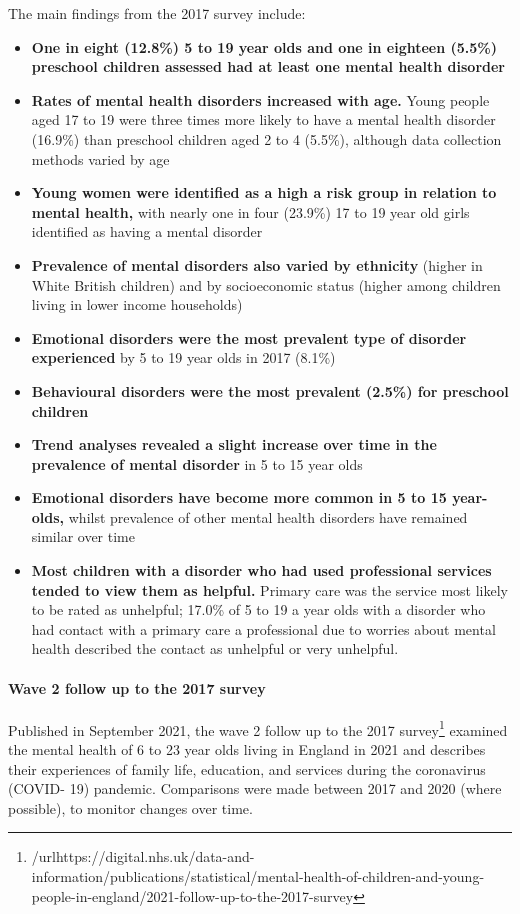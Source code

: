The main findings from the 2017 survey include:
\begin{itemize}[noitemsep]
    \item {\bfseries One in eight (12.8\%) 5 to 19 year olds and one in eighteen (5.5\%) preschool children assessed had at least one mental health disorder}
    \item {\bfseries Rates of mental health disorders increased with age.} Young people aged 17 to 19 were three times more likely to have a mental health disorder (16.9\%) than preschool children aged 2 to 4 (5.5\%), although data collection methods varied by age
    \item {\bfseries Young women were identified as a high a risk group in relation to mental health,} with nearly one in four (23.9\%) 17 to 19 year old girls identified as having a mental disorder
    \item {\bfseries Prevalence of mental disorders also varied by ethnicity} (higher in White British children) and by socioeconomic status (higher among children living in lower income households)
    \item {\bfseries Emotional disorders were the most prevalent type of disorder experienced} by 5 to 19 year olds in 2017 (8.1\%)
    \item {\bfseries Behavioural disorders were the most prevalent (2.5\%) for preschool children}
    \item {\bfseries Trend analyses revealed a slight increase over time in the prevalence of mental disorder} in 5 to 15 year olds
    \item {\bfseries Emotional disorders have become more common in 5 to 15 year-olds,} whilst prevalence of other mental health disorders have remained similar over time
    \item {\bfseries Most children with a disorder who had used professional services tended to view them as helpful.} Primary care was the service most likely to be rated as unhelpful; 17.0\% of 5 to 19 a year olds with a disorder who had contact with a primary care a professional due to worries about mental health described the contact as unhelpful or very unhelpful.
\end{itemize}

\paragraph{Wave 2 follow up to the 2017 survey}
Published in September 2021, the wave 2 follow up to the 2017 survey\footnote{/url{https://digital.nhs.uk/data-and-information/publications/statistical/mental-health-of-children-and-young-people-in-england/2021-follow-up-to-the-2017-survey}} examined the mental health of 6 to 23 year olds living in England in 2021 and describes their experiences of family life, education, and services during the coronavirus (COVID- 19) pandemic. Comparisons were made between 2017 and 2020 (where possible), to monitor changes over time.

